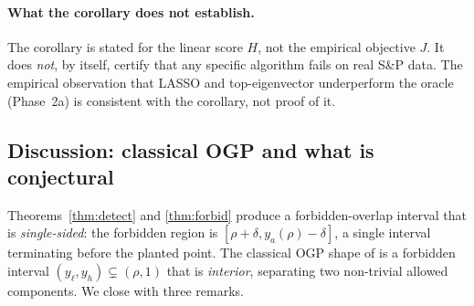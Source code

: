 \paragraph{What the corollary does not establish.} The corollary is stated for the linear
score $H$, not the empirical objective $J$. It does \emph{not}, by itself, certify that
any specific algorithm fails on real S\&P data. The empirical observation that LASSO and
top-eigenvector underperform the oracle (Phase~2a) is consistent with the corollary, not
proof of it.

\subsection{Discussion: classical OGP and what is conjectural}
\label{ssec:ogp-discussion}

Theorems~\ref{thm:detect} and \ref{thm:forbid} produce a forbidden-overlap interval that is
\emph{single-sided}: the forbidden region is $[\rho+\delta, y_a(\rho)-\delta]$, a single
interval terminating before the planted point. The classical OGP shape of \cite{gamarnik-zadik-clique,gamarnik-pnas}
is a forbidden interval $(y_\ell, y_h)\subsetneq(\rho,1)$ that is \emph{interior}, separating
two non-trivial allowed components. We close with three remarks.

